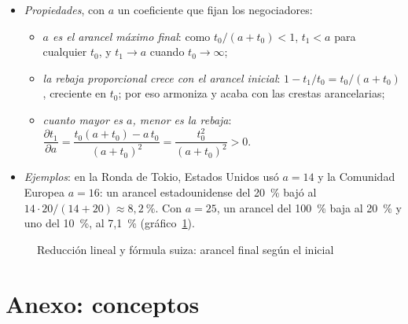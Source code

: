 \documentclass[11pt]{article}
\begin{document}
\begin{itemize}
\item \emph{Propiedades}, con $a$ un coeficiente que fijan los negociadores:
  \begin{itemize}
  \item \emph{$a$ es el arancel máximo final}: como $t_0/(a+t_0)<1$, $t_1<a$ para cualquier $t_0$, y $t_1\to a$ cuando $t_0\to\infty$;
  \item \emph{la rebaja proporcional crece con el arancel inicial}: $1-t_1/t_0=t_0/(a+t_0)$, creciente en $t_0$; por eso armoniza y acaba con las crestas arancelarias;
  \item \emph{cuanto mayor es $a$, menor es la rebaja}: $\dfrac{\partial t_1}{\partial a}=\dfrac{t_0(a+t_0)-a\,t_0}{(a+t_0)^2}=\dfrac{t_0^2}{(a+t_0)^2}>0$.\findemo
  \end{itemize}
\item \emph{Ejemplos}: en la Ronda de Tokio, Estados Unidos usó $a=14$ y la Comunidad Europea $a=16$: un arancel estadounidense del 20~\% bajó al $14\cdot20/(14+20)\approx8{,}2~\%$\nocite{Baldwin2012Case}. Con $a=25$, un arancel del 100~\% baja al 20~\% y uno del 10~\%, al 7,1~\% (gráfico~\ref{fig:suiza}).
\end{itemize}

\begin{figure}[H]
\centering
\caption{Reducción lineal y fórmula suiza: arancel final según el inicial}\label{fig:suiza}
\end{figure}

\section{Anexo: conceptos}\label{anexo:conceptos}
\end{document}
